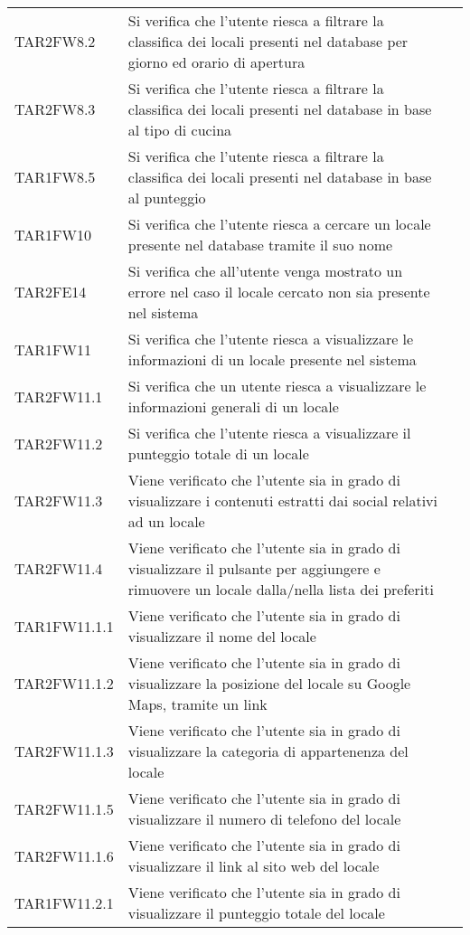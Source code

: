 \begin{longtable}{ m{}<{\centering}  m{}<{\centering}  m{}<{\centering} }
	TAR2FW8.2 & Si verifica che l'utente riesca a filtrare la classifica dei locali presenti nel database per giorno ed orario di apertura & \Ni \\
	TAR2FW8.3 & Si verifica che l'utente riesca a filtrare la classifica dei locali presenti nel database in base al tipo di cucina & \Ni \\
	TAR1FW8.5 & Si verifica che l'utente riesca a filtrare la classifica dei locali presenti nel database in base al punteggio & \Ni \\
	TAR1FW10 & Si verifica che l'utente riesca a cercare un locale presente nel database tramite il suo nome & \Ni \\
	TAR2FE14 & Si verifica che all'utente venga mostrato un errore nel caso il locale cercato non sia presente nel sistema & \Ni \\
	TAR1FW11 & Si verifica che l'utente riesca a visualizzare le informazioni di un locale presente nel sistema & \Ni \\
	TAR2FW11.1 & Si verifica che un utente riesca a visualizzare le informazioni generali di un locale & \Ni \\
	TAR2FW11.2 & Si verifica che l'utente riesca a visualizzare il punteggio totale di un locale & \Ni \\
	TAR2FW11.3 & Viene verificato che l'utente sia in grado di visualizzare i contenuti estratti dai social relativi ad un locale & \Ni \\
	TAR2FW11.4 & Viene verificato che l'utente sia in grado di visualizzare il pulsante per aggiungere e rimuovere un locale dalla/nella lista dei preferiti & \Ni \\
	TAR1FW11.1.1 &	Viene verificato che l'utente sia in grado di visualizzare il nome del locale & \Ni \\
	TAR2FW11.1.2 & Viene verificato che l'utente sia in grado di visualizzare la posizione del locale su Google Maps, tramite un link & \Ni \\
	TAR2FW11.1.3	& Viene verificato che l'utente sia in grado di visualizzare la categoria di appartenenza del locale & \Ni \\
	TAR2FW11.1.5	& Viene verificato che l'utente sia in grado di visualizzare il numero di telefono del locale & \Ni \\
	TAR2FW11.1.6	& Viene verificato che l'utente sia in grado di visualizzare il link al sito web del locale & \Ni \\
	TAR1FW11.2.1	& Viene verificato che l'utente sia in grado di visualizzare il punteggio totale del locale & \Ni \\

\end{longtable}
